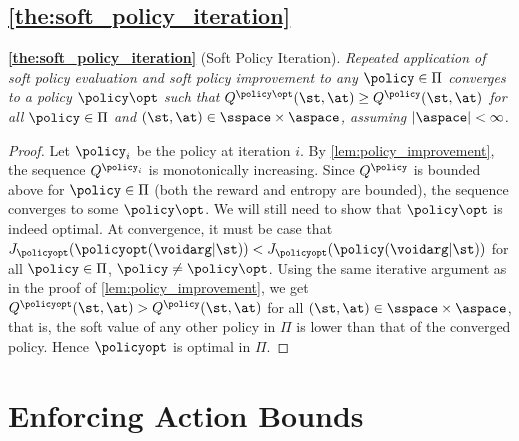 \documentclass{article}
\begin{document}
\subsection{\autoref{the:soft_policy_iteration}}
\label{app:the_soft_policy_iteration}







\textbf{\autoref{the:soft_policy_iteration}} (Soft Policy Iteration). \textit{
Repeated application of soft policy evaluation and soft policy improvement to any $\policy\in\Pi$ converges to a policy $\policy\opt$ such that $Q^{\policy\opt}(\st, \at) \geq Q^{\policy}(\st, \at)$ for all $\policy \in \Pi$ and $(\st, \at) \in \sspace\times\aspace$, assuming $|\aspace|<\infty$.}
\begin{proof}
Let $\policy_i$ be the policy at iteration $i$. By \autoref{lem:policy_improvement}, the sequence $Q^{\policy_i}$ is monotonically increasing. Since $Q^\policy$ is bounded above for $\policy \in \Pi$ (both the reward and entropy are bounded), the sequence converges to some $\policy\opt$. We will still need to show that $\policy\opt$ is indeed optimal. At convergence, it must be case that $J_\policyopt(\policyopt(\voidarg|\st)) < J_\policyopt(\policy(\voidarg|\st))$ for all $\policy\in\Pi$, $\policy\neq \policy\opt$. Using the same iterative argument as in the proof of \autoref{lem:policy_improvement}, we get $Q^\policyopt(\st, \at) > Q^\policy(\st, \at)$ for all $(\st, \at)\in \sspace\times\aspace$, that is, the soft value of any other policy in $\Pi$ is lower than that of the converged policy. Hence $\policyopt$ is optimal in $\Pi$.
\end{proof}




\section{Enforcing Action Bounds}
\label{app:action_bounds}
%
\end{document}
